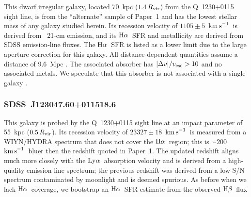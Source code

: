 \documentclass[twocolumn,twocolappendix,tighten,times]{aastex6}
\newcommand{\HI}{\ion{H}{1}}
\newcommand{\Ha}{\ensuremath{{\rm H}\alpha}}
\newcommand{\Hb}{\ensuremath{{\rm H}\beta}}
\newcommand{\kms}{\ensuremath{{\rm km\,s}^{-1}}}
\newcommand{\lya}{\ensuremath{{\rm Ly}\alpha}}
\begin{document}
This dwarf irregular galaxy, located 70~kpc ($1.4\,R_{\rm vir}$) from the 
Q~1230+0115 sight line, is from the ``alternate'' sample of Paper~1 and 
has the lowest stellar mass of any galaxy studied herein. Its recession 
velocity of $1105\pm5$~\kms\ is derived from \HI\ 21-cm emission, 
and its \Ha\ SFR and metallicity are derived from SDSS emission-line fluxes.
The \Ha\ SFR is listed as a lower limit due to the large aperture correction for
this galaxy. All distance-dependent quantities assume a distance of 
9.6~Mpc \citep{karachentsev13}. The associated absorber has 
$|\Delta v|/v_{\rm esc} > 10$ and no associated metals. We speculate that this 
absorber is not associated with a single galaxy \citep[see also][]{rosenberg03}.


\subsubsection{SDSS~J123047.60+011518.6}
\label{indiv:galaxies:sdssj1230+01}

This galaxy is probed by the Q~1230+0115 sight line at an impact parameter of 
55~kpc ($0.5\,R_{\rm vir}$). Its recession velocity of $23327\pm18$~\kms\ 
is measured from a WIYN/HYDRA spectrum that does not cover the \Ha\ region; this 
is $\sim200$~\kms\ bluer then the redshift quoted in Paper~1. The updated redshift
aligns much more closely with the \lya\ absorption velocity and is derived 
from a high-quality emission line spectrum; the previous redshift was derived from 
a low-S/N spectrum contaminated by moonlight \citep{mclin03} and is deemed 
spurious. As before when we lack \Ha\ coverage, we bootstrap an \Ha\ SFR estimate 
from the observed \Hb\ flux 


\end{document}
